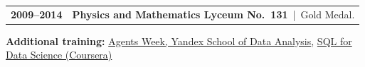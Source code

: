 \documentclass[12pt]{article}
\begin{document}
\begin{tabularx}{\textwidth}{@{}l >{\RaggedRight\arraybackslash}X@{}}
\textbf{2009--2014} &
\textbf{Physics and Mathematics Lyceum No.~131}
\,|\, Gold Medal.
\end{tabularx}

\vspace{4pt}
{\RaggedRight
\textbf{Additional training:}
\href{https://education.yandex.ru/profile/docs?id=3bbef619-3937-436f-80f8-69444f154c1c}
{\textcolor{blue!65!black}{Agents Week, Yandex School of Data Analysis}}, \href{https://coursera.org/share/4f64abf86f701eb8df6e2b00cb6e4768}{\textcolor{blue!65!black}{SQL for Data Science (Coursera)}}
\par}
\end{document}
